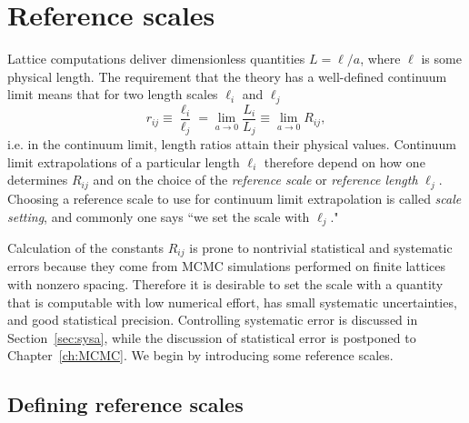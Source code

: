 \section{Reference scales}\label{sec:refscales}

Lattice computations deliver dimensionless quantities $L=\ell/a$, where 
$\ell$ is some physical length. The requirement that the theory has a 
well-defined continuum limit means that for two length scales 
$\ell_i$ and $\ell_j$
\begin{equation}
  r_{ij}\equiv\frac{\ell_i}{\ell_j}=\lim_{a\to 0}\frac{L_i}{L_j}
        \equiv\lim_{a\to 0}R_{ij},
\end{equation}
i.e. in the continuum limit, length ratios attain their
physical values.
Continuum limit extrapolations of a particular length $\ell_i$ therefore
depend on how one determines $R_{ij}$ and on the choice of the
{\it reference scale} or {\it reference length} $\ell_j$. 
Choosing a reference scale to use for continuum limit extrapolation
is called {\it scale setting}, and commonly one says
``we set the scale with $\ell_j$."

Calculation of the constants $R_{ij}$ is prone to nontrivial statistical and
systematic errors because they come from MCMC simulations performed on 
finite lattices with nonzero spacing. Therefore it is desirable to set
the scale with a quantity that is computable with low numerical effort,
has small systematic uncertainties, and good statistical precision.
Controlling systematic error is
discussed in Section~\ref{sec:sysa}, while the
discussion of statistical error is postponed to 
Chapter~\ref{ch:MCMC}. We begin by introducing some reference scales. 

\subsection{Defining reference scales}\label{sec:definescales}

